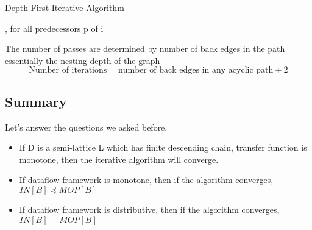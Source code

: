 \begin{algorithm}
	\caption{Depth-First Iterative Algorithm}\label{alg:Reverse Postorder}
	\begin{algorithmic}
		\EndFunction

		\EndFor
		\EndFunction
		\EndFor
		\EndFor
		, for all predecessors p of i
		\EndIf
		\EndFor
		\EndWhile
	\end{algorithmic}
\end{algorithm}


The number of passes are determined by number of back edges in the path essentially the nesting depth of the graph
\[
	\text{Number of iterations} = \text{number of back edges in any acyclic
		path} + 2
\]
\subsection{Summary}
Let's answer the questions we asked before.
\begin{itemize}
	\item If D is a semi-lattice L which has finite descending chain, transfer function is monotone,
	      then the iterative algorithm will converge.
	\item  If dataflow framework is monotone,  then if the algorithm converges,
	      $IN[B] \preceq  MOP[B] $
	\item If dataflow framework is distributive, then if the algorithm converges,
	      $IN[B] = MOP[B]$
\end{itemize}


